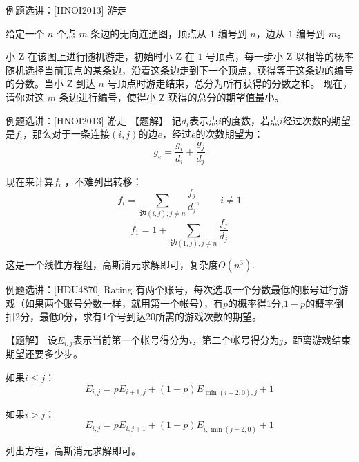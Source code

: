 \documentclass{beamer}
\begin{document}
\begin{frame}{例题选讲：[HNOI2013] 游走}

给定一个 $n$ 个点 $m$ 条边的无向连通图，顶点从 $1$ 编号到 $n$，边从 $1$ 编号到 $m$。 

小 Z 在该图上进行随机游走，初始时小 Z 在 $1$ 号顶点，每一步小 Z 以相等的概率随机选择当前顶点的某条边，沿着这条边走到下一个顶点，获得等于这条边的编号的分数。当小 Z 到达 $n$ 号顶点时游走结束，总分为所有获得的分数之和。 现在，请你对这 $m$ 条边进行编号，使得小 Z 获得的总分的期望值最小。

\end{frame}

\begin{frame}{例题选讲：[HNOI2013] 游走}
    【题解】 记$d_i$表示点$i$的度数，若点$i$经过次数的期望是$f_i$，那么对于一条连接$(i,j)$的边$e$，经过$e$的次数期望为：
    \begin{equation*}
        g_e=\frac{g_i}{d_i}+\frac{g_j}{d_j}
    \end{equation*}

    现在来计算$f_i$
    \pause
    ，不难列出转移：
    \begin{equation*}
        f_i=\sum_{\text{边}(i,j),j\neq n} \frac{f_j}{d_j},\qquad i\neq 1
    \end{equation*}
    \begin{equation*}
        f_1=1+\sum_{\text{边}(1,j),j\neq n} \frac{f_j}{d_j}
    \end{equation*}

    这是一个线性方程组，高斯消元求解即可，复杂度$O(n^3)$.
\end{frame}

\begin{frame}{例题选讲：[HDU4870] Rating}
    \small 
    有两个账号，每次选取一个分数最低的账号进行游戏（如果两个账号分数一样，就用第一个帐号），有$p$的概率得1分,$1-p$的概率倒扣2分，最低0分，求有1个号到达20所需的游戏次数的期望。

    \vspace{1em}\pause
    【题解】 设$E_{i,j}$表示当前第一个帐号得分为$i$，第二个帐号得分为$j$，距离游戏结束期望还要多少步。

    \pause
    如果$i\leq j$：
    \begin{equation*}
        E_{i,j}=pE_{i+1,j}+(1-p)E_{\min(i-2,0),j}+1
    \end{equation*}

    如果$i>j$：
    \begin{equation*}
        E_{i,j}=pE_{i,j+1}+(1-p)E_{i,\min(j-2,0)}+1
    \end{equation*}

    \pause
    列出方程，高斯消元求解即可。
\end{frame}
\end{document}
